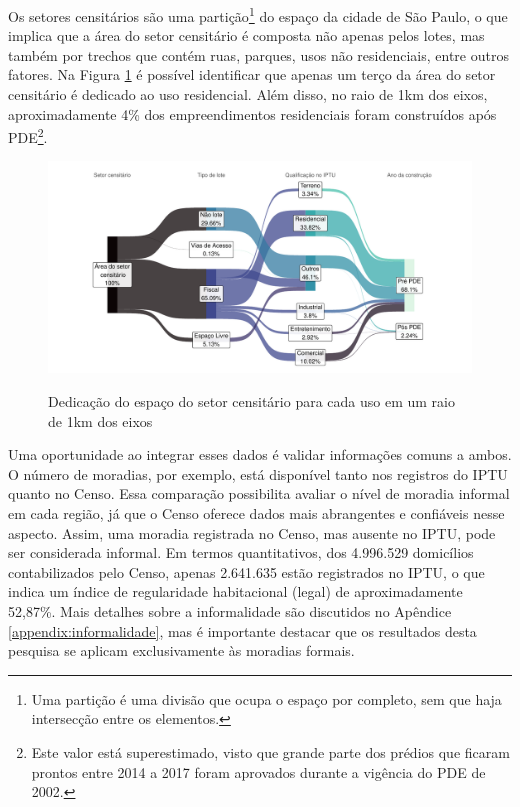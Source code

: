Os setores censitários são uma partição\footnote{Uma partição é uma divisão que ocupa o espaço por completo, sem que haja intersecção entre os elementos.} do espaço da cidade de São Paulo, o que implica que a área do setor censitário é composta não apenas pelos lotes, mas também por trechos que contém ruas, parques, usos não residenciais, entre outros fatores. Na Figura \ref{fig:area-setor} é possível identificar que apenas um terço da área do setor censitário é dedicado ao uso residencial. Além disso, no raio de 1km dos eixos, aproximadamente 4\% dos empreendimentos residenciais foram construídos após PDE\footnote{Este valor está superestimado, visto que grande parte dos prédios que ficaram prontos entre 2014 a 2017 foram aprovados durante a vigência do PDE de 2002.}.
 
\begin{figure}[h]
    \centering
    \caption{Dedicação do espaço do setor censitário para cada uso em um raio de 1km dos eixos}
    \includegraphics[width = \linewidth]{figuras/area_setor.pdf}
    \label{fig:area-setor}
\end{figure}

Uma oportunidade ao integrar esses dados é validar informações comuns a ambos. O número de moradias, por exemplo, está disponível tanto nos registros do IPTU quanto no Censo. Essa comparação possibilita avaliar o nível de moradia informal em cada região, já que o Censo oferece dados mais abrangentes e confiáveis nesse aspecto. Assim, uma moradia registrada no Censo, mas ausente no IPTU, pode ser considerada informal. Em termos quantitativos, dos 4.996.529 domicílios contabilizados pelo Censo, apenas 2.641.635 estão registrados no IPTU, o que indica um índice de regularidade habitacional (legal) de aproximadamente 52,87\%. Mais detalhes sobre a informalidade são discutidos no Apêndice \ref{appendix:informalidade}, mas é importante destacar que os resultados desta pesquisa se aplicam exclusivamente às moradias formais.

